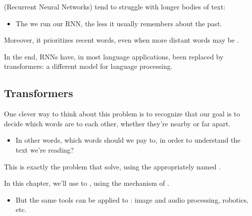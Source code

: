     \begin{concept}
         (Recurrent Neural Networks) tend to struggle with longer bodies of text:

        \begin{itemize}
            \item The  we run our RNN, the less it usually remembers about the  past.
        \end{itemize}

        Moreover, it prioritizes recent words, even when more distant words may be .
        
    \end{concept}

    In the end, RNNs have, in most language applications, been replaced by transformers: a different model for language processing.

    

\phantom{}

\subsection{Transformers}

    One clever way to think about this problem is to recognize that our goal is to decide which words are  to each other, whether they're nearby or far apart.

    \begin{itemize}
        \item In other words, which words should we pay  to, in order to understand the text we're reading?
    \end{itemize}

    This is exactly the problem that  solve, using the appropriately named .\\

    \begin{clarification}
        In this chapter, we'll use  to , using the mechanism of .

        
        \begin{itemize}
            \item But the same tools can be applied to : image and audio processing, robotics, etc.
        \end{itemize}
    \end{clarification}

